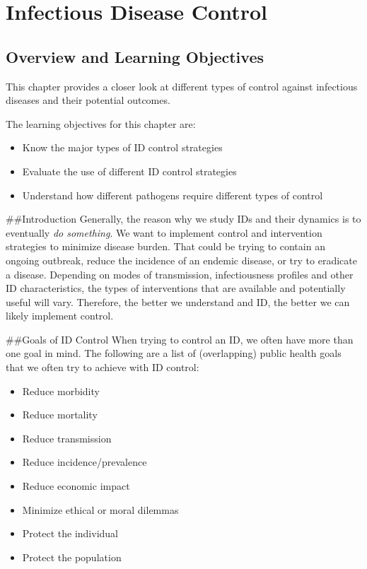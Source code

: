 \documentclass[]{book}
\providecommand{\tightlist}{%
  \setlength{\itemsep}{0pt}\setlength{\parskip}{0pt}}
\theoremstyle{definition}
\theoremstyle{definition}
\theoremstyle{definition}
\theoremstyle{remark}
\begin{document}
\hypertarget{infectious-disease-control}{%
\chapter{Infectious Disease Control}\label{infectious-disease-control}}

\hypertarget{overview-and-learning-objectives-8}{%
\section{Overview and Learning
Objectives}\label{overview-and-learning-objectives-8}}

This chapter provides a closer look at different types of control
against infectious diseases and their potential outcomes.

The learning objectives for this chapter are:

\begin{itemize}
\tightlist
\item
  Know the major types of ID control strategies
\item
  Evaluate the use of different ID control strategies
\item
  Understand how different pathogens require different types of control
\end{itemize}

\#\#Introduction Generally, the reason why we study IDs and their
dynamics is to eventually \emph{do something}. We want to implement
control and intervention strategies to minimize disease burden. That
could be trying to contain an ongoing outbreak, reduce the incidence of
an endemic disease, or try to eradicate a disease. Depending on modes of
transmission, infectiousness profiles and other ID characteristics, the
types of interventions that are available and potentially useful will
vary. Therefore, the better we understand and ID, the better we can
likely implement control.

\#\#Goals of ID Control When trying to control an ID, we often have more
than one goal in mind. The following are a list of (overlapping) public
health goals that we often try to achieve with ID control:

\begin{itemize}
\tightlist
\item
  Reduce morbidity
\item
  Reduce mortality
\item
  Reduce transmission
\item
  Reduce incidence/prevalence
\item
  Reduce economic impact
\item
  Minimize ethical or moral dilemmas
\item
  Protect the individual
\item
  Protect the population
\end{itemize}
\end{document}
